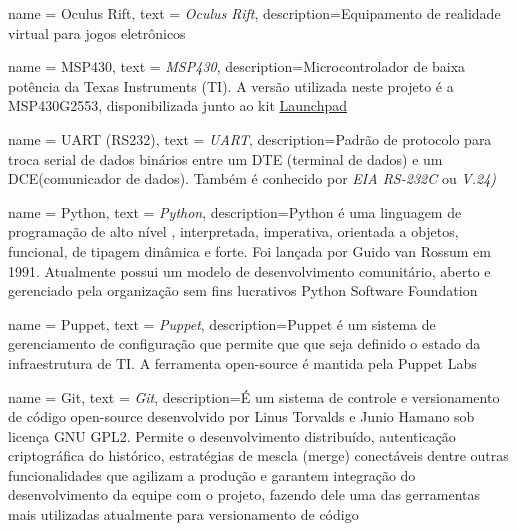 {
	name = Oculus Rift,
	text = \textit{Oculus Rift},
	description={Equipamento de realidade virtual para jogos eletrônicos}
}

{
	name = MSP430,
	text = \textit{MSP430},
	description={Microcontrolador de baixa potência da Texas Instruments (TI). A versão utilizada neste projeto é a MSP430G2553, disponibilizada junto ao kit \href{http://www.ti.com/tool/msp-exp430g2}{Launchpad}}
}

{
	name = UART (RS232),
	text = \textit{UART},
	description={Padrão de protocolo para troca serial de dados binários entre um DTE (terminal de dados) e um DCE(comunicador de dados). Também é conhecido por \textit{EIA RS-232C} ou \textit{V.24)}}
}

{
	name = Python,
	text = \textit{Python},
	description={Python é uma linguagem de programação de alto nível , interpretada, imperativa, orientada a objetos, funcional, de tipagem dinâmica e forte. Foi lançada por Guido van Rossum em 1991\cite{python_history}. Atualmente possui um modelo de desenvolvimento comunitário, aberto e gerenciado pela organização sem fins lucrativos Python Software Foundation}
}

{
	name = Puppet,
	text = \textit{Puppet},
	description={Puppet é um sistema de gerenciamento de configuração que permite que que seja definido o estado da infraestrutura de TI. A ferramenta open-source é mantida pela Puppet Labs}
}

{
	name = Git,
	text = \textit{Git},
	description={É um sistema de controle e versionamento de código open-source desenvolvido por Linus Torvalds e Junio Hamano sob licença GNU GPL2. Permite o desenvolvimento distribuído, autenticação criptográfica do histórico, estratégias de mescla (merge) conectáveis dentre outras funcionalidades que agilizam a produção e garantem integração do desenvolvimento da equipe com o projeto, fazendo dele uma das gerramentas mais utilizadas atualmente para versionamento de código}
}

